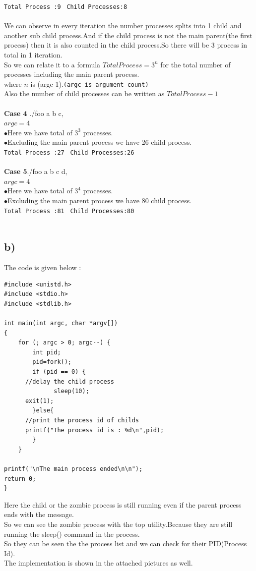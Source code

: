 \documentclass{article}
\begin{document}
\texttt{Total Process :9 } 
\texttt{Child Processes:8}\\
\\
We can observe in every iteration the number processes splits into 1 child and another sub child process.And if the child process is not the main parent(the first process) then it is also counted in the child process.So there will be 3 process in total in 1 iteration.\\
So we can relate it to a formula $Total Process=3^{n}$ for the total number of processes including the main parent process.\\
where $n$ is (argc-1).\texttt{(argc is argument count)}\\
Also the number of child processes can be written as $Total Process -1$\\\\
\textbf{Case 4} ./foo a b c, \\
$argc=4$\\
$\bullet$Here we have total of $3^{3}$ processes.\\
$\bullet$Excluding the main parent process we have 26 child process.\\

\texttt{Total Process :27 } 
\texttt{Child Processes:26}\\
\\
\textbf{Case 5}./foo a b c d, \\
$argc=4$\\
$\bullet$Here we have total of $3^{4}$ processes.\\
$\bullet$Excluding the main parent process we have 80 child process.\\

\texttt{Total Process :81 } 
\texttt{Child Processes:80}\\
\\
\subsection*{\textbf{b)}}
The code is given below : 
\begin{verbatim}
#include <unistd.h>
#include <stdio.h>
#include <stdlib.h>

int main(int argc, char *argv[])
{
    for (; argc > 0; argc--) {
        int pid;
        pid=fork();
        if (pid == 0) { 
	  //delay the child process	
         	  sleep(10);
	  exit(1);
        }else{
	  //print the process id of childs
	  printf("The process id is : %d\n",pid); 
        }
    }
 
printf("\nThe main process ended\n\n");
return 0;
}

\end{verbatim}
Here the child or the zombie process is still running even if the parent process ends with the message.\\So we can see the zombie process with the top utility.Because they are still running the sleep() command in the process.\\
So they can be seen the the process list and we can check for their PID(Process Id).\\
The implementation is shown in the attached pictures as well.\\
\end{document}
